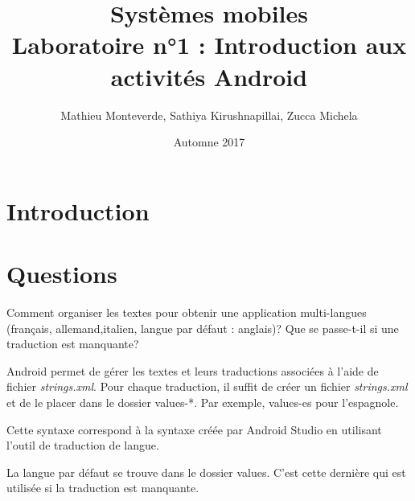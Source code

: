 \documentclass[11pt, a4paper, french]{article}
\title{Systèmes mobiles \\ Laboratoire n°1 : Introduction aux activités Android}
\author{Mathieu Monteverde, Sathiya Kirushnapillai, Zucca Michela}
\date{Automne 2017}
\begin{document}
	\maketitle
    
    \setlength{\parskip}{1em}
	
	\section*{Introduction}	

    \section*{Questions}

        Comment organiser les textes pour obtenir une application multi-langues (français, allemand,italien, langue par défaut : anglais)? Que se passe-t-il si une traduction est manquante? \par
        
        Android permet de gérer les textes et leurs traductions associées à l'aide de fichier \textit{strings.xml}. Pour chaque traduction, il suffit de créer un fichier \textit{strings.xml} et de le placer dans le dossier values-*. Par exemple, values-es pour l'espagnole.\par

        Cette syntaxe correspond à la syntaxe créée par Android Studio en utilisant l'outil de traduction de langue. 
        
        La langue par défaut se trouve dans le dossier values. C'est cette dernière qui est utilisée si la traduction est manquante.

    
	
\end{document}
